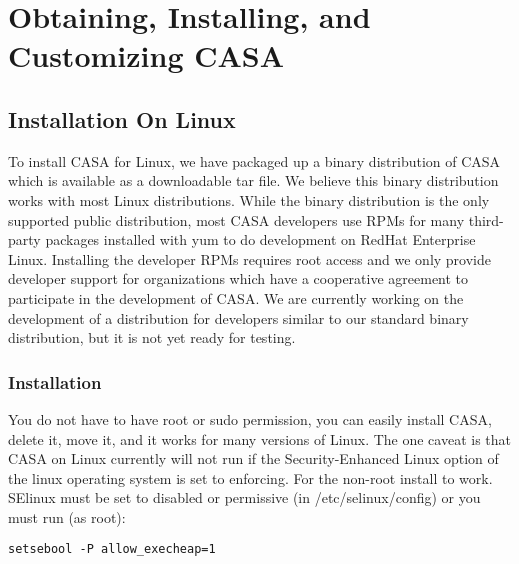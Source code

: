 

\chapter[Appendix: Obtaining, Installing, and Customizing CASA]{Obtaining,
  Installing, and Customizing CASA}
\label{chapter:install}

\section{Installation On Linux}
\label{section:install.script}

To install CASA for Linux, we have packaged up a binary distribution
of CASA which is available as a downloadable tar file. We believe this
binary distribution works with most Linux distributions. While the
binary distribution is the only supported public distribution, most
CASA developers use RPMs for many third-party packages installed with
yum to do development on RedHat Enterprise Linux. Installing the
developer RPMs requires root access and we only provide developer
support for organizations which have a cooperative agreement to
participate in the development of CASA. We are currently working on
the development of a distribution for developers similar to our
standard binary distribution, but it is not yet ready for testing.


\subsection{Installation}

You do not have to have root or sudo permission, you can easily
install CASA, delete it, move it, and it works for many versions of
Linux. The one caveat is that CASA on Linux currently will not run if
the Security-Enhanced Linux option of the linux operating system is
set to enforcing. For the non-root install to work. SElinux must be
set to disabled or permissive (in /etc/selinux/config) or you must run
(as root):

\small
\begin{verbatim}
setsebool -P allow_execheap=1
\end{verbatim}
\normalsize

